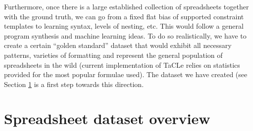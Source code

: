\pubrev
Furthermore, once there is a large established collection of spreadsheets together with the ground truth, we can go from a fixed flat bias of supported constraint templates to learning syntax, levels of nesting, etc. This would follow a general program synthesis and machine learning ideas. To do so realistically, we have to create a certain ``golden standard'' dataset that would exhibit all necessary patterns, varieties of formatting and represent the general population of spreadsheets in the wild (current implementation of TaCLe relies on statistics provided for the most popular formulae used). The dataset we have created (see Section \ref{appendix:dataset_overview} is a first step towards this direction.
\pubrevend

\section{Spreadsheet dataset overview} \label{appendix:dataset_overview}
